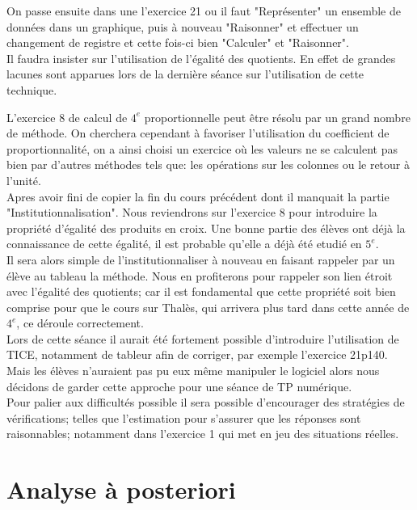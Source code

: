 On passe ensuite dans une l'exercice 21 ou il faut "Représenter" un ensemble de données dans un graphique,
puis à nouveau "Raisonner" et effectuer un changement de registre et cette fois-ci bien "Calculer" et "Raisonner".\\
Il faudra insister sur l'utilisation de l'égalité des quotients.
En effet de grandes lacunes sont apparues lors de la dernière séance sur l'utilisation de cette technique.

L'exercice 8 de calcul de $4^e$ proportionnelle peut être résolu par un grand nombre de méthode.
On cherchera cependant à favoriser l'utilisation du coefficient de proportionnalité,
on a ainsi choisi un exercice où les valeurs ne se calculent pas bien par d'autres méthodes tels que:
les opérations sur les colonnes ou le retour à l'unité.\\

Apres avoir fini de copier la fin du cours précédent dont il manquait la partie "Institutionnalisation".
Nous reviendrons sur l'exercice 8 pour introduire la propriété d'égalité des produits en croix.
Une bonne partie des élèves ont déjà la connaissance de cette égalité,
il est probable qu'elle a déjà été etudié en $5^e$.\\
Il sera alors simple de l'institutionnaliser à nouveau en faisant rappeler par un élève au tableau la méthode.
Nous en profiterons pour rappeler son lien étroit avec l'égalité des quotients;
car il est fondamental que cette propriété soit bien comprise pour que le cours sur Thalès, qui arrivera plus tard
dans cette année de $4^e$, ce déroule correctement.\\

Lors de cette séance il aurait été fortement possible d'introduire l'utilisation de TICE,
notamment de tableur afin de corriger, par exemple l'exercice 21p140.
Mais les élèves n'auraient pas pu eux même manipuler le logiciel alors nous décidons de garder cette approche pour une séance de TP numérique.\\

Pour palier aux difficultés possible il sera possible d'encourager des stratégies de vérifications;
telles que l'estimation pour s'assurer que les réponses sont raisonnables; notamment dans l'exercice 1 qui met en jeu des situations réelles.

\section*{Analyse à posteriori}

